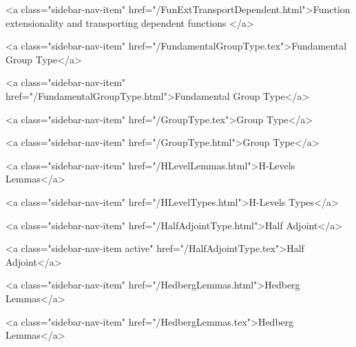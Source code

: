           <a class="sidebar-nav-item" href="/FunExtTransportDependent.html">Function extensionality and transporting dependent functions </a>
        
      
    
      
        
          <a class="sidebar-nav-item" href="/FundamentalGroupType.tex">Fundamental Group Type</a>
        
      
    
      
        
          <a class="sidebar-nav-item" href="/FundamentalGroupType.html">Fundamental Group Type</a>
        
      
    
      
        
          <a class="sidebar-nav-item" href="/GroupType.tex">Group Type</a>
        
      
    
      
        
          <a class="sidebar-nav-item" href="/GroupType.html">Group Type</a>
        
      
    
      
        
          <a class="sidebar-nav-item" href="/HLevelLemmas.html">H-Levels Lemmas</a>
        
      
    
      
        
          <a class="sidebar-nav-item" href="/HLevelTypes.html">H-Levels Types</a>
        
      
    
      
        
          <a class="sidebar-nav-item" href="/HalfAdjointType.html">Half Adjoint</a>
        
      
    
      
        
          <a class="sidebar-nav-item active" href="/HalfAdjointType.tex">Half Adjoint</a>
        
      
    
      
        
          <a class="sidebar-nav-item" href="/HedbergLemmas.html">Hedberg Lemmas</a>
        
      
    
      
        
          <a class="sidebar-nav-item" href="/HedbergLemmas.tex">Hedberg Lemmas</a>
        
